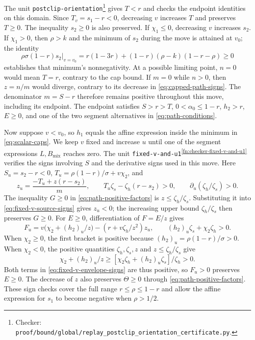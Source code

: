 \documentclass[11pt]{article}
\theoremstyle{remark}
\theoremstyle{plain}
\begin{document}
The unit \nolinkurl{postclip-orientation}\footnote{Checker:
\nolinkurl{proof/bound/global/replay_postclip_orientation_certificate.py}.\label{fn:checker-postclip-orientation}} gives $T<r$ and
checks the endpoint identities on this domain. Since
$T_v=s_1-r<0$, decreasing $v$ increases $T$ and preserves $T\ge0$.
The inequality $s_2\ge0$ is also preserved. If $\chi_1\le0$,
decreasing $v$ increases $s_2$. If $\chi_1>0$, then $\rho>k$ and
the minimum of $s_2$ during the move is attained at $v_0$; the identity
\begin{equation}
 \rho\sigma(1-r)\left.s_2\right|_{v=v_0}
 =r(1-3r)+(1-r)(\rho-k)(1-r-\rho)\ge0
 \label{eq:capped-s2-endpoint}
\end{equation}
establishes that minimum's nonnegativity.
At a possible limiting point, $n=0$ would mean $T=r$, contrary
to the cap bound. If $m=0$ while $n>0$, then $z=n/m$ would diverge,
contrary to its decrease in \eqref{eq:capped-path-signs}.
The denominator $m=S-r$ therefore remains positive throughout
this move, including its endpoint.
The endpoint satisfies $S>r>T$, $0<\alpha_0\le1-r$, $h_2>r$, $E\ge0$,
and one of the two segment alternatives in \eqref{eq:path-conditions}.

Now suppose $v<v_0$, so $h_1$ equals the affine expression inside
the minimum in \eqref{eq:scalar-caps}. We keep $v$ fixed and
increase $u$ until one of the segment expressions $L,B_{\mathrm{mix}}$
reaches zero. The unit
\nolinkurl{fixed-v-and-u1}\textsuperscript{\ref{fn:checker-fixed-v-and-u1}} verifies the signs involving $S$ and the
derivative signs used in this move.
Here $S_u=s_2-r<0$,
$T_u=\rho(1-r)/\sigma+v\chi_2$, and
\begin{equation}
 z_u=\frac{-T_u+z(r-s_2)}m,\qquad
 T_u\zeta_s-\zeta_h(r-s_2)>0,\qquad
 \partial_u(\zeta_h/\zeta_s)>0.
 \label{eq:fixed-v-source-signs}
\end{equation}
The inequality $G\ge0$ in \eqref{eq:path-positive-factors} is
$z\le \zeta_h/\zeta_s$. Substituting it into
\eqref{eq:fixed-v-source-signs} gives $z_u<0$; the increasing upper
bound $\zeta_h/\zeta_s$ then preserves $G\ge0$.
For $E\ge0$, differentiation of $F=E/z$ gives
\begin{equation}
 F_u=v\bigl(\chi_2+(h_2)_u/z\bigr)
       -(r+v\zeta_h/z^2)z_u,
 \qquad (h_2)_u\zeta_s+\chi_2\zeta_h>0.
 \label{eq:fixed-v-envelope-signs}
\end{equation}
When $\chi_2\ge0$, the first bracket is positive because
$(h_2)_u=\rho(1-r)/\sigma>0$. When $\chi_2<0$, the positive
quantities $\zeta_h,\zeta_s,z$ and $z\le \zeta_h/\zeta_s$ give
\[
 \chi_2+(h_2)_u/z
 \ge[\chi_2\zeta_h+(h_2)_u\zeta_s]/\zeta_h>0.
\]
Both terms in \eqref{eq:fixed-v-envelope-signs} are thus positive,
so $F_u>0$ preserves $E\ge0$. The decrease of $z$ also preserves
$\Theta\ge0$ through \eqref{eq:path-positive-factors}.
These sign checks cover the full range $r\le\rho\le1-r$ and allow
the affine expression for $s_1$ to become negative when $\rho>1/2$.
\end{document}
